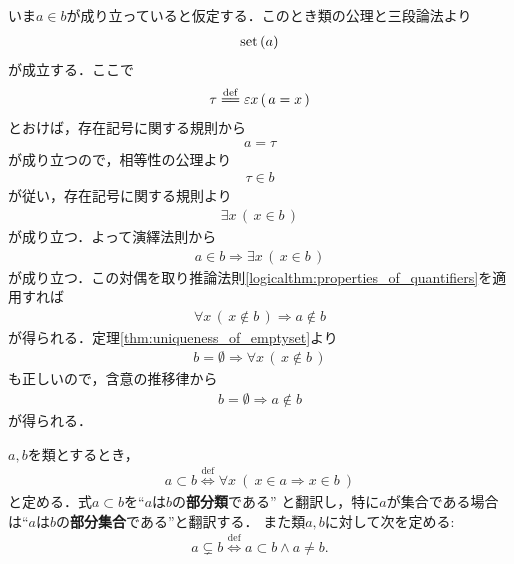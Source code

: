 	\begin{prf}
		いま$a \in b$が成り立っていると仮定する．このとき類の公理と三段論法より
		\begin{align}
			\operatorname*{set} \left(a\right)
		\end{align}
		が成立する．ここで
		\begin{align}
			\tau \defeq \varepsilon x\, (\, a = x\, )
		\end{align}
		とおけば，存在記号に関する規則から
		\begin{align}
			a = \tau
		\end{align}
		が成り立つので，相等性の公理より
		\begin{align}
			\tau \in b
		\end{align}
		が従い，存在記号に関する規則より
		\begin{align}
			\exists x\, (\, x \in b\, )
		\end{align}
		が成り立つ．よって演繹法則から
		\begin{align}
			a \in b \Longrightarrow \exists x\, (\, x \in b\, )
		\end{align}
		が成り立つ．この対偶を取り推論法則\ref{logicalthm:properties_of_quantifiers}を適用すれば
		\begin{align}
			\forall x\, (\, x \notin b\, ) \Longrightarrow a \notin b
		\end{align}
		が得られる．定理\ref{thm:uniqueness_of_emptyset}より
		\begin{align}
			b = \emptyset \Longrightarrow \forall x\, (\, x \notin b\, )
		\end{align}
		も正しいので，含意の推移律から
		\begin{align}
			b = \emptyset \Longrightarrow a \notin b
		\end{align}
		が得られる．
		\QED
	\end{prf}
	
	\begin{screen}
		\begin{dfn}[部分類]
			$a,b$を類とするとき，
			\begin{align}
				a \subset b \overset{\mathrm{def}}{\Longleftrightarrow}
				\forall x\ (\ x \in a \Longrightarrow x \in b\ )
			\end{align}
			と定める．式$a \subset b$を``$a$は$b$の{\bf 部分類}である''
			と翻訳し，特に$a$が集合である場合は``$a$は$b$の{\bf 部分集合}である''と翻訳する．
			また類$a,b$に対して次を定める:
			\begin{align}
				a \subsetneq b \overset{\mathrm{def}}{\Longleftrightarrow}
				a \subset b \wedge a \neq b.
			\end{align}
		\end{dfn}
	\end{screen}
	
